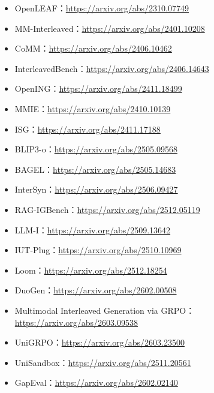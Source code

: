 \begin{itemize}[leftmargin=1.5em]
  \item OpenLEAF：\href{https://arxiv.org/abs/2310.07749}{https://arxiv.org/abs/2310.07749}
  \item MM-Interleaved：\href{https://arxiv.org/abs/2401.10208}{https://arxiv.org/abs/2401.10208}
  \item CoMM：\href{https://arxiv.org/abs/2406.10462}{https://arxiv.org/abs/2406.10462}
  \item InterleavedBench：\href{https://arxiv.org/abs/2406.14643}{https://arxiv.org/abs/2406.14643}
  \item OpenING：\href{https://arxiv.org/abs/2411.18499}{https://arxiv.org/abs/2411.18499}
  \item MMIE：\href{https://arxiv.org/abs/2410.10139}{https://arxiv.org/abs/2410.10139}
  \item ISG：\href{https://arxiv.org/abs/2411.17188}{https://arxiv.org/abs/2411.17188}
  \item BLIP3-o：\href{https://arxiv.org/abs/2505.09568}{https://arxiv.org/abs/2505.09568}
  \item BAGEL：\href{https://arxiv.org/abs/2505.14683}{https://arxiv.org/abs/2505.14683}
  \item InterSyn：\href{https://arxiv.org/abs/2506.09427}{https://arxiv.org/abs/2506.09427}
  \item RAG-IGBench：\href{https://arxiv.org/abs/2512.05119}{https://arxiv.org/abs/2512.05119}
  \item LLM-I：\href{https://arxiv.org/abs/2509.13642}{https://arxiv.org/abs/2509.13642}
  \item IUT-Plug：\href{https://arxiv.org/abs/2510.10969}{https://arxiv.org/abs/2510.10969}
  \item Loom：\href{https://arxiv.org/abs/2512.18254}{https://arxiv.org/abs/2512.18254}
  \item DuoGen：\href{https://arxiv.org/abs/2602.00508}{https://arxiv.org/abs/2602.00508}
  \item Multimodal Interleaved Generation via GRPO：\href{https://arxiv.org/abs/2603.09538}{https://arxiv.org/abs/2603.09538}
  \item UniGRPO：\href{https://arxiv.org/abs/2603.23500}{https://arxiv.org/abs/2603.23500}
  \item UniSandbox：\href{https://arxiv.org/abs/2511.20561}{https://arxiv.org/abs/2511.20561}
  \item GapEval：\href{https://arxiv.org/abs/2602.02140}{https://arxiv.org/abs/2602.02140}
\end{itemize}
